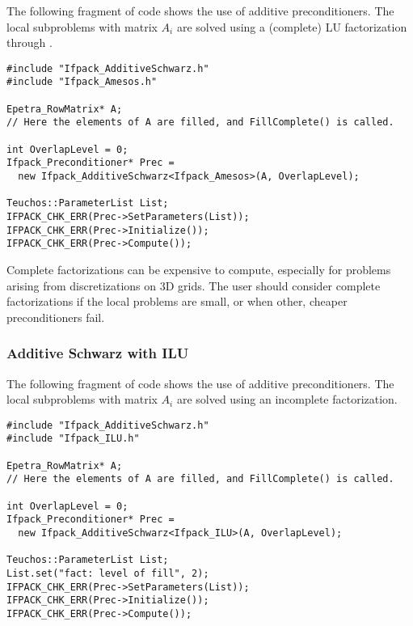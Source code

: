 The following fragment of code shows the use of additive preconditioners. The
local subproblems with matrix $A_i$ are solved using a (complete) LU
factorization through \amesos.
\begin{verbatim}
#include "Ifpack_AdditiveSchwarz.h"
#include "Ifpack_Amesos.h"

Epetra_RowMatrix* A;
// Here the elements of A are filled, and FillComplete() is called.

int OverlapLevel = 0;
Ifpack_Preconditioner* Prec = 
  new Ifpack_AdditiveSchwarz<Ifpack_Amesos>(A, OverlapLevel);

Teuchos::ParameterList List;
IFPACK_CHK_ERR(Prec->SetParameters(List));
IFPACK_CHK_ERR(Prec->Initialize());
IFPACK_CHK_ERR(Prec->Compute());
\end{verbatim}

\begin{remark}
Complete factorizations can be expensive to compute, especially for problems
arising from discretizations on 3D grids. The user should consider complete
factorizations if the local problems are small, or when other, cheaper
preconditioners fail.
\end{remark}

\subsubsection{Additive Schwarz with ILU}
\label{sec:as_ilu}

The following fragment of code shows the use of additive preconditioners. The
local subproblems with matrix $A_i$ are solved using an incomplete
factorization.
\begin{verbatim}
#include "Ifpack_AdditiveSchwarz.h"
#include "Ifpack_ILU.h"

Epetra_RowMatrix* A;
// Here the elements of A are filled, and FillComplete() is called.

int OverlapLevel = 0;
Ifpack_Preconditioner* Prec = 
  new Ifpack_AdditiveSchwarz<Ifpack_ILU>(A, OverlapLevel);

Teuchos::ParameterList List;
List.set("fact: level of fill", 2);
IFPACK_CHK_ERR(Prec->SetParameters(List));
IFPACK_CHK_ERR(Prec->Initialize());
IFPACK_CHK_ERR(Prec->Compute());
\end{verbatim}
\smallskip


